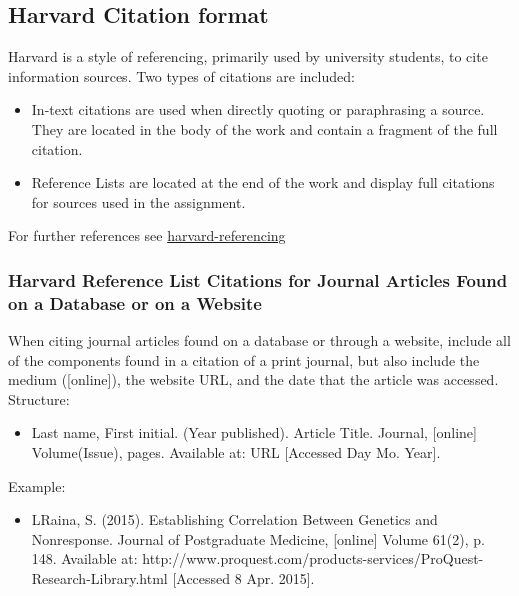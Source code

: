 \subsection{Harvard Citation format}


Harvard is a style of referencing, primarily used by university students, to cite information sources.
Two types of citations are included:\\

\begin{itemize}
	\item In-text citations are used when directly quoting or paraphrasing a source. They are located in the body of the work and contain a fragment of the full citation. 
	\item Reference Lists are located at the end of the work and display full citations for sources used in the assignment.
\end{itemize}
For further references see \href{http://www.citethisforme.com/harvard-referencing}{harvard-referencing}

\subsubsection{Harvard Reference List Citations for Journal Articles Found on a Database or on a Website}

When citing journal articles found on a database or through a website, include all of the components found in a citation of a print journal, but also include the medium ([online]), the website URL, and the date that the article was accessed.\\
Structure:\\
\begin{itemize}
	\item Last name, First initial. (Year published). Article Title. Journal, [online] Volume(Issue), pages. Available at: URL [Accessed Day Mo. Year].
\end{itemize}
Example:\\
\begin{itemize}
	\item LRaina, S. (2015). Establishing Correlation Between Genetics and Nonresponse. Journal of Postgraduate Medicine, [online] Volume 61(2), p. 148. Available at: http://www.proquest.com/products-services/ProQuest-Research-Library.html [Accessed 8 Apr. 2015].
\end{itemize}

